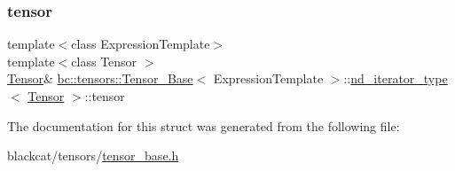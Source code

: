 \mbox{\label{structbc_1_1tensors_1_1Tensor__Base_1_1nd__iterator__type_a939845b78f09f5739c11f9e25f3b42bc}} 
\subsubsection{\texorpdfstring{tensor}{tensor}}
{\footnotesize\ttfamily template$<$class Expression\+Template$>$ \\
template$<$class Tensor $>$ \\
\hyperlink{namespacebc_a659391e47ab612be3ba6c18cf9c89159}{Tensor}\& \hyperlink{classbc_1_1tensors_1_1Tensor__Base}{bc\+::tensors\+::\+Tensor\+\_\+\+Base}$<$ Expression\+Template $>$\+::\hyperlink{structbc_1_1tensors_1_1Tensor__Base_1_1nd__iterator__type}{nd\+\_\+iterator\+\_\+type}$<$ \hyperlink{namespacebc_a659391e47ab612be3ba6c18cf9c89159}{Tensor} $>$\+::tensor}



The documentation for this struct was generated from the following file\+:\begin{DoxyCompactItemize}
\item 
blackcat/tensors/\hyperlink{tensor__base_8h}{tensor\+\_\+base.\+h}\end{DoxyCompactItemize}
